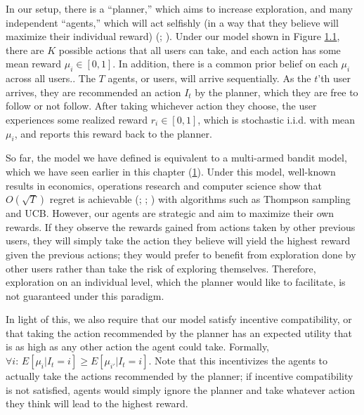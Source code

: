 \documentclass[
  letterpaper,
  numbers=noenddot,
  DIV=11]{scrreprt}
\theoremstyle{plain}
\theoremstyle{definition}
\theoremstyle{remark}
\begin{document}
In our setup, there is a ``planner,'' which aims to increase
exploration, and many independent ``agents,'' which will act selfishly
(in a way that they believe will maximize their individual reward)
(;
). Under our model shown in Figure
\hyperref[fig-planner-agent]{1.1}, there are \(K\) possible actions that
all users can take, and each action has some mean reward
\(\mu_i \in [0, 1]\). In addition, there is a common prior belief on
each \(\mu_i\) across all users.. The \(T\) agents, or users, will
arrive sequentially. As the \(t\)'th user arrives, they are recommended
an action \(I_t\) by the planner, which they are free to follow or not
follow. After taking whichever action they choose, the user experiences
some realized reward \(r_i \in [0, 1]\), which is stochastic i.i.d. with
mean \(\mu_i\), and reports this reward back to the planner.

So far, the model we have defined is equivalent to a multi-armed bandit
model, which we have seen earlier in this chapter
(\hyperref[4optim]{1}). Under this model, well-known results in
economics, operations research and computer science show that
\(O(\sqrt{T})\) regret is achievable
(; ; ) with algorithms such as Thompson sampling and UCB. However, our
agents are strategic and aim to maximize their own rewards. If they
observe the rewards gained from actions taken by other previous users,
they will simply take the action they believe will yield the highest
reward given the previous actions; they would prefer to benefit from
exploration done by other users rather than take the risk of exploring
themselves. Therefore, exploration on an individual level, which the
planner would like to facilitate, is not guaranteed under this paradigm.

In light of this, we also require that our model satisfy incentive
compatibility, or that taking the action recommended by the planner has
an expected utility that is as high as any other action the agent could
take. Formally,
\(\forall i : \, E[\mu_i | I_t = i] \geq E[\mu_{i'} | I_t = i].\) Note
that this incentivizes the agents to actually take the actions
recommended by the planner; if incentive compatibility is not satisfied,
agents would simply ignore the planner and take whatever action they
think will lead to the highest reward.
\end{document}
